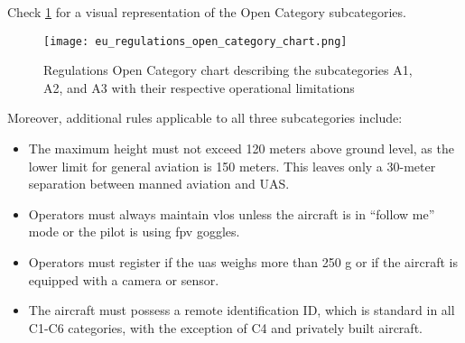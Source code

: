 Check \cref{fig:eu_regulations_open_category_chart} for a visual representation of the Open Category subcategories.

\begin{figure}
  \texttt{[image: eu\_regulations\_open\_category\_chart.png]}
  \caption{ Regulations Open Category chart describing the subcategories A1, A2, and A3 with their respective operational limitations \autocite{ageagleEuropeanUnion}}\label{fig:eu_regulations_open_category_chart}
\end{figure}

Moreover, additional rules applicable to all three subcategories include:

\begin{itemize}
  \item The maximum height must not exceed 120 meters above ground level, as the lower limit for general aviation is 150 meters. This leaves only a 30-meter separation between manned aviation and UAS.\@

  \item Operators must always maintain \gls{vlos} unless the aircraft is in ``follow me'' mode or the pilot is using \gls{fpv} goggles.

  \item Operators must register if the \gls{uas} weighs more than 250 g or if the aircraft is equipped with a camera or sensor.

  \item The aircraft must possess a remote identification ID, which is standard in all C1-C6 categories, with the exception of C4 and privately built aircraft.
\end{itemize}

